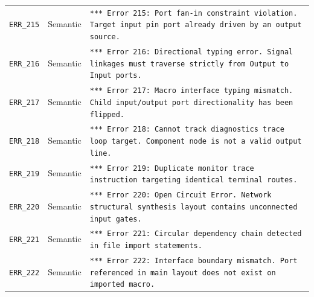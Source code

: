 \documentclass[10pt,a4paper]{article}
\begin{document}
\begin{longtable}{llp{8.2cm}}
\texttt{ERR\_215} & Semantic & \texttt{*** Error 215: Port fan-in constraint violation. Target input pin port already driven by an output source.} \\ \addlinespace
\texttt{ERR\_216} & Semantic & \texttt{*** Error 216: Directional typing error. Signal linkages must traverse strictly from Output to Input ports.} \\ \addlinespace
\texttt{ERR\_217} & Semantic & \texttt{*** Error 217: Macro interface typing mismatch. Child input/output port directionality has been flipped.} \\ \addlinespace
\texttt{ERR\_218} & Semantic & \texttt{*** Error 218: Cannot track diagnostics trace loop target. Component node is not a valid output line.} \\ \addlinespace
\texttt{ERR\_219} & Semantic & \texttt{*** Error 219: Duplicate monitor trace instruction targeting identical terminal routes.} \\ \addlinespace
\texttt{ERR\_220} & Semantic & \texttt{*** Error 220: Open Circuit Error. Network structural synthesis layout contains unconnected input gates.} \\ \addlinespace
\texttt{ERR\_221} & Semantic & \texttt{*** Error 221: Circular dependency chain detected in file import statements.} \\ \addlinespace
\texttt{ERR\_222} & Semantic & \texttt{*** Error 222: Interface boundary mismatch. Port referenced in main layout does not exist on imported macro.} \\

\end{longtable}
\end{document}
